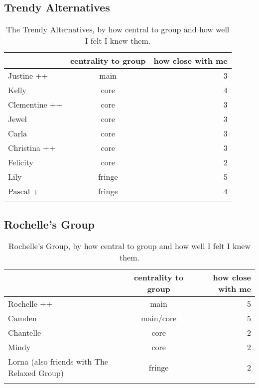 \subsection{Trendy Alternatives}
\nopagebreak
\begin{table}[ht]
\caption{The Trendy Alternatives, by how central to group and how well I felt I knew them.}	\label{append:Alternatives}
	\centering
		\begin{tabular}{lcr} \\
		\lsptoprule
			\multirow{2}{*}{\sc name} & \multicolumn{1}{p{2cm}}{\centering \sc centrality to group} & \multicolumn{1}{p{1.75cm}}{\centering \sc how close with me}  \\
			\midrule
Justine ++ & main & 3 \\
Kelly & core & 4 \\
Clementine ++ & core & 3 \\
Jewel  & core & 3 \\
Carla  & core & 3 \\
Christina ++ & core & 3 \\
Felicity & core & 2 \\
Lily  & fringe & 5 \\
Pascal +  & fringe & 4 \\

   \lspbottomrule
		\end{tabular}
\end{table}

\subsection{Rochelle's Group}
\nopagebreak
\begin{table}[ht]
\caption{Rochelle's Group, by how central to group and how well I felt I knew them.}	\label{append:Drama}
	\centering
		\begin{tabular}{p{4cm}cr} \\
		\lsptoprule
			\multirow{2}{*}{\sc name} & \multicolumn{1}{p{2cm}}{\centering \sc centrality to group} & \multicolumn{1}{p{1.75cm}}{\centering \sc how close with me}  \\
		\midrule
		Rochelle ++ & main & 5 \\
		Camden   & main/core & 5 \\
		Chantelle & core & 2 \\
		Mindy     & core & 2 \\
		Lorna (also friends with The Relaxed Group)    & fringe & 2 \\
		   \lspbottomrule
	\end{tabular}
\end{table}


